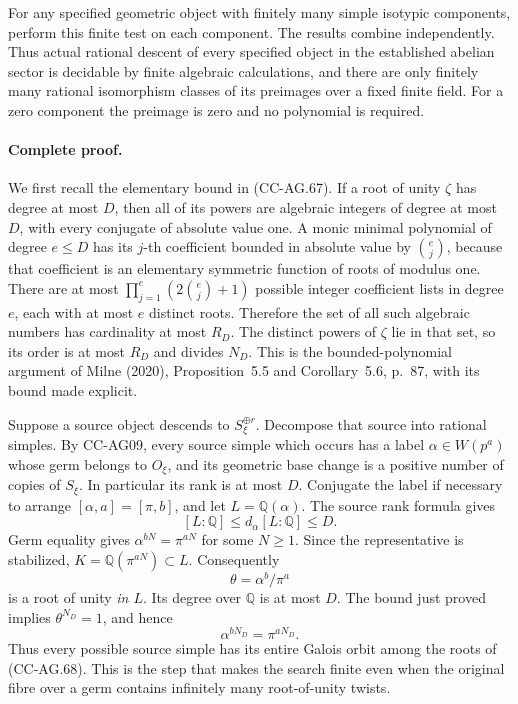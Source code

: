 For any specified geometric object with finitely many
simple isotypic components, perform this finite test on
each component.  The results combine independently.
Thus actual rational descent of every specified object
in the established abelian sector is decidable by finite
algebraic calculations, and there are only finitely many
rational isomorphism classes of its preimages over a
fixed finite field.  For a zero component the preimage
is zero and no polynomial is required.

\paragraph{Complete proof.}
We first recall the elementary bound in (CC-AG.67).
If a root of unity \(\zeta\) has degree at most \(D\),
then all of its powers are algebraic integers of degree
at most \(D\), with every conjugate of absolute value
one.  A monic minimal polynomial of degree \(e\le D\)
has its \(j\)-th coefficient bounded in absolute value
by \(\binom ej\), because that coefficient is an
elementary symmetric function of roots of modulus one.
There are at most
\(\prod_{j=1}^{e}(2\binom ej+1)\) possible integer
coefficient lists in degree \(e\), each with at most
\(e\) distinct roots.  Therefore the set of all such
algebraic numbers has cardinality at most \(R_D\).
The distinct powers of \(\zeta\) lie in that set, so
its order is at most \(R_D\) and divides \(N_D\).
This is the bounded-polynomial argument of Milne
(2020), Proposition~5.5 and Corollary~5.6, p.~87,
with its bound made explicit.

Suppose a source object descends to
\(S_\xi^{\oplus r}\).  Decompose that source into
rational simples.  By CC-AG09, every source simple
which occurs has a label \(\alpha\in W(p^a)\)
whose germ belongs to \(O_\xi\), and its geometric
base change is a positive number of copies of
\(S_\xi\).  In particular its rank is at most \(D\).
Conjugate the label if necessary to arrange
\([\alpha,a]=[\pi,b]\), and let
\(L=\mathbb Q(\alpha)\).
The source rank formula gives
\[
                      [L:\mathbb Q]
                       \le d_\alpha[L:\mathbb Q]
                       \le D.
                                                               \tag{CC-AG.72}
\]
Germ equality gives
\(\alpha^{bN}=\pi^{aN}\) for some \(N\ge1\).
Since the representative is stabilized,
\(K=\mathbb Q(\pi^{aN})\subset L\).
Consequently
\[
                              \theta=\alpha^b/\pi^a
\]
is a root of unity \emph{in \(L\)}.
Its degree over \(\mathbb Q\) is at most \(D\).
The bound just proved implies \(\theta^{N_D}=1\),
and hence
\[
                          \alpha^{bN_D}=\pi^{aN_D}.
                                                               \tag{CC-AG.73}
\]
Thus every possible source simple has its entire
Galois orbit among the roots of (CC-AG.68).
This is the step that makes the search finite even
when the original fibre over a germ contains
infinitely many root-of-unity twists.

